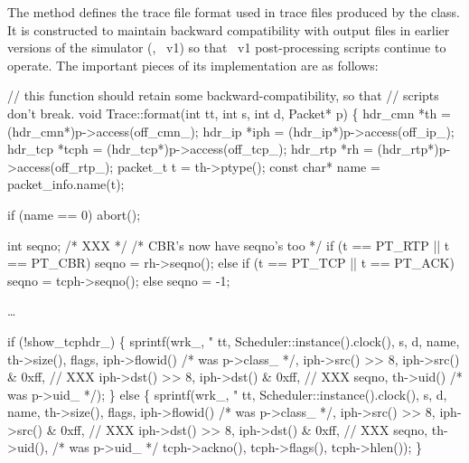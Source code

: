 The  method defines the trace file format used
in trace files produced by the  class.
It is constructed to maintain backward compatibility with output files
in earlier versions of the simulator (\ie, \ns~v1) so that \ns~v1
post-processing scripts continue to operate.
The important pieces of its implementation are as follows:
\begin{program}
        // {\cf this function should retain some backward-compatibility, so that}
        // {\cf scripts don't break.}
        void Trace::format(int tt, int s, int d, Packet* p)
        \{
                hdr_cmn *th = (hdr_cmn*)p->access(off_cmn_);
                hdr_ip *iph = (hdr_ip*)p->access(off_ip_);
                hdr_tcp *tcph = (hdr_tcp*)p->access(off_tcp_);
                hdr_rtp *rh = (hdr_rtp*)p->access(off_rtp_);
                packet_t t = th->ptype();
                const char* name = packet_info.name(t);

                if (name == 0)
                        abort();

                int seqno;
                /* XXX */
                /* {\cf CBR's now have seqno's too} */
                if (t == PT_RTP || t == PT_CBR)
                        seqno = rh->seqno();
                else if (t == PT_TCP || t == PT_ACK)
                        seqno = tcph->seqno();
                else
                        seqno = -1;

                \ldots

                if (!show_tcphdr_) \{
                        sprintf(wrk_, "%
                                tt,
                                Scheduler::instance().clock(),
                                s,
                                d,
                                name,
                                th->size(),
                                flags,
                                iph->flowid() /* was p->class_ */,
                                iph->src() >> 8, iph->src() & 0xff,     // XXX
                                iph->dst() >> 8, iph->dst() & 0xff,     // XXX
                                seqno,
                                th->uid() /* was p->uid_ */);
                \} else \{
                        sprintf(wrk_,
                        "%
                                tt,
                                Scheduler::instance().clock(),
                                s,
                                d,
                                name,
                                th->size(),
                                flags,
                                iph->flowid() /* was p->class_ */,
                                iph->src() >> 8, iph->src() & 0xff,     // XXX
                                iph->dst() >> 8, iph->dst() & 0xff,     // XXX
                                seqno,
                                th->uid(), /* was p->uid_ */
                                tcph->ackno(),
                                tcph->flags(),
                                tcph->hlen());
                \}
\end{program}
